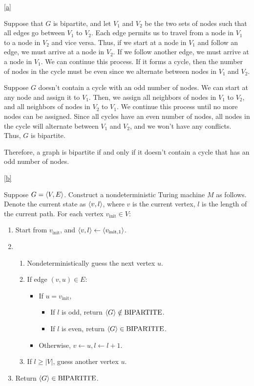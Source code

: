 \documentclass{homework}
\begin{document}
\begin{solution}

  \ref{a}

  Suppose that $G$ is bipartite, and let $V_1$ and $V_2$ be the two sets of
  nodes such that all edges go between $V_1$ to $V_2$. Each edge permits us
  to travel from a node in $V_1$ to a node in $V_2$ and vice versa. Thus, if
  we start at a node in $V_1$ and follow an edge, we must arrive at a node in
  $V_2$. If we follow another edge, we must arrive at a node in $V_1$. We can
  continue this process. If it forms a cycle, then the number of nodes in the
  cycle must be even since we alternate between nodes in $V_1$ and $V_2$.

  Suppose $G$ doesn't contain a cycle with an odd number of nodes. We can
  start at any node and assign it to $V_1$. Then, we assign all neighbors of
  nodes in $V_1$ to $V_2$, and all neighbors of nodes in $V_2$ to $V_1$. We
  continue this process until no more nodes can be assigned. Since all cycles
  have an even number of nodes, all nodes in the cycle will alternate
  between $V_1$ and $V_2$, and we won't have any conflicts. Thus, $G$ is
  bipartite.

  Therefore, a graph is bipartite if and only if it doesn't contain a cycle
  that has an odd number of nodes.

  \ref{b}

  Suppose $G = \langle V, E\rangle$.
  Construct a nondeterministic Turing machine $M$ as follows.
  Denote the current state as $\langle v, l\rangle$,
  where $v$ is the current vertex, $l$ is the length of the current path.
  For each vertex $v_{\text{init}} \in V$:
  \begin{enumerate}
    \item Start from $v_{\text{init}}$, and
    $\langle v, l\rangle \gets \langle v_{\text{init}, 1}\rangle$.
    \item 
      \begin{enumerate}
        \item Nondeterministically guess the next vertex $u$.
        \item If edge $(v, u) \in E$:
          \begin{itemize}
            \item If $u = v_{\text{init}}$,
            \begin{itemize}
              \item If $l$ is odd, return $\langle G\rangle \notin \mathrm{BIPARTITE}$.
              \item If $l$ is even, return $\langle G\rangle \in \mathrm{BIPARTITE}$.
            \end{itemize}
            \item Otherwise, $v \gets u, l \gets l + 1$.
          \end{itemize}
        \item If $l \ge |V|$, guess another vertex $u$.
      \end{enumerate}
    \item Return $\langle G\rangle \in \mathrm{BIPARTITE}$.
  \end{enumerate}


\end{solution}
\end{document}
